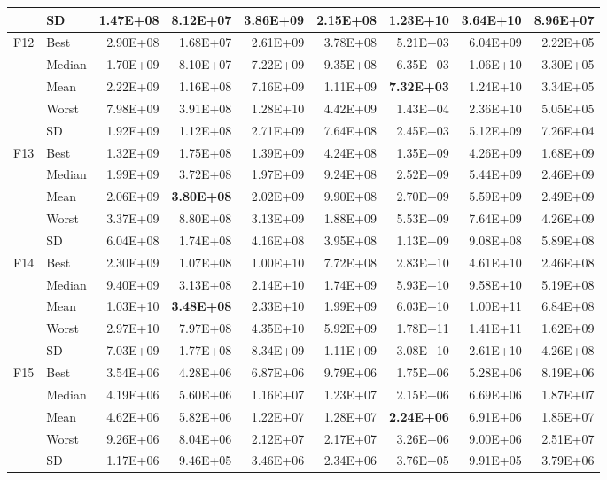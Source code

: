 \documentclass[algorithms,article,submit,moreauthors,pdftex]{Definitions/mdpi}
\newcommand{\bestval}[1]{\textbf{#1}}
\begin{document}
\begin{table}[p]
{\begin{tabular}{llrrrrrrr}
 & SD & 1.47E+08 & 8.12E+07 & 3.86E+09 & 2.15E+08 & 1.23E+10 & 3.64E+10 & 8.96E+07 \\
\midrule
F12 & Best & 2.90E+08 & 1.68E+07 & 2.61E+09 & 3.78E+08 & 5.21E+03 & 6.04E+09 & 2.22E+05 \\
 & Median & 1.70E+09 & 8.10E+07 & 7.22E+09 & 9.35E+08 & 6.35E+03 & 1.06E+10 & 3.30E+05 \\
 & Mean & 2.22E+09 & 1.16E+08 & 7.16E+09 & 1.11E+09 & \bestval{7.32E+03} & 1.24E+10 & 3.34E+05 \\
 & Worst & 7.98E+09 & 3.91E+08 & 1.28E+10 & 4.42E+09 & 1.43E+04 & 2.36E+10 & 5.05E+05 \\
 & SD & 1.92E+09 & 1.12E+08 & 2.71E+09 & 7.64E+08 & 2.45E+03 & 5.12E+09 & 7.26E+04 \\
\midrule
F13 & Best & 1.32E+09 & 1.75E+08 & 1.39E+09 & 4.24E+08 & 1.35E+09 & 4.26E+09 & 1.68E+09 \\
 & Median & 1.99E+09 & 3.72E+08 & 1.97E+09 & 9.24E+08 & 2.52E+09 & 5.44E+09 & 2.46E+09 \\
 & Mean & 2.06E+09 & \bestval{3.80E+08} & 2.02E+09 & 9.90E+08 & 2.70E+09 & 5.59E+09 & 2.49E+09 \\
 & Worst & 3.37E+09 & 8.80E+08 & 3.13E+09 & 1.88E+09 & 5.53E+09 & 7.64E+09 & 4.26E+09 \\
 & SD & 6.04E+08 & 1.74E+08 & 4.16E+08 & 3.95E+08 & 1.13E+09 & 9.08E+08 & 5.89E+08 \\
\midrule
F14 & Best & 2.30E+09 & 1.07E+08 & 1.00E+10 & 7.72E+08 & 2.83E+10 & 4.61E+10 & 2.46E+08 \\
 & Median & 9.40E+09 & 3.13E+08 & 2.14E+10 & 1.74E+09 & 5.93E+10 & 9.58E+10 & 5.19E+08 \\
 & Mean & 1.03E+10 & \bestval{3.48E+08} & 2.33E+10 & 1.99E+09 & 6.03E+10 & 1.00E+11 & 6.84E+08 \\
 & Worst & 2.97E+10 & 7.97E+08 & 4.35E+10 & 5.92E+09 & 1.78E+11 & 1.41E+11 & 1.62E+09 \\
 & SD & 7.03E+09 & 1.77E+08 & 8.34E+09 & 1.11E+09 & 3.08E+10 & 2.61E+10 & 4.26E+08 \\
\midrule
F15 & Best & 3.54E+06 & 4.28E+06 & 6.87E+06 & 9.79E+06 & 1.75E+06 & 5.28E+06 & 8.19E+06 \\
 & Median & 4.19E+06 & 5.60E+06 & 1.16E+07 & 1.23E+07 & 2.15E+06 & 6.69E+06 & 1.87E+07 \\
 & Mean & 4.62E+06 & 5.82E+06 & 1.22E+07 & 1.28E+07 & \bestval{2.24E+06} & 6.91E+06 & 1.85E+07 \\
 & Worst & 9.26E+06 & 8.04E+06 & 2.12E+07 & 2.17E+07 & 3.26E+06 & 9.00E+06 & 2.51E+07 \\
 & SD & 1.17E+06 & 9.46E+05 & 3.46E+06 & 2.34E+06 & 3.76E+05 & 9.91E+05 & 3.79E+06 \\
\bottomrule
\end{tabular}}
\end{table}
\end{document}
